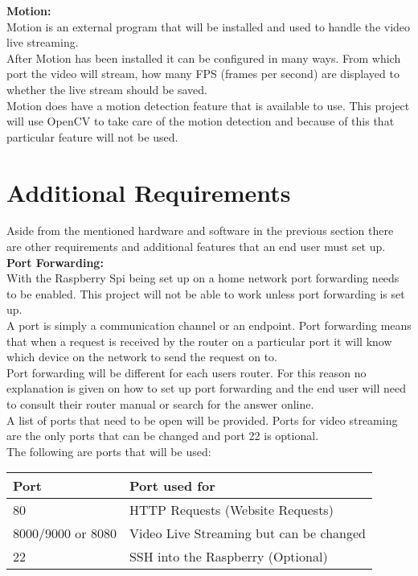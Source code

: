 \documentclass[]{report}
\begin{document}
\noindent
{\bf Motion:}\\
\break
Motion is an external program that will be installed and used to handle the video live streaming.\\

After Motion has been installed it can be configured in many ways. From which port the video will stream, how many FPS (frames per second) are displayed to whether the live stream should be saved.\\

Motion does have a motion detection feature that is available to use. This project will use OpenCV to take care of the motion detection and because of this that particular feature will not be used.\\

\clearpage
\section{Additional Requirements}	
\label{sec:additional}
Aside from the mentioned hardware and software in the previous section there are other requirements and additional features that an end user must set up.\\

\noindent
{\bf Port Forwarding:}\\
\break
With the Raspberry Spi being set up on a home network port forwarding needs to be enabled. This project will not be able to work unless port forwarding is set up.\\

A port is simply a communication channel or an endpoint. Port forwarding means that when a request is received by the router on a particular port it will know which device on the network to send the request on to.\\

Port forwarding will be different for each users router. For this reason no explanation is given on how to set up port forwarding and the end user will need to consult their router manual or search for the answer online.\\

A list of ports that need to be open will be provided. Ports for video streaming are the only ports that can be changed and port 22 is optional. \\

The following are ports that will be used:

\begin{center}
    \begin{tabular}{ | l | p{7cm} |}
    \hline
    {\bf Port} & {\bf Port used for} \\ \hline
   80 & HTTP Requests (Website Requests) \\ \hline 
   8000/9000 or 8080 & Video Live Streaming but can be changed\\ \hline
	22 & SSH into the Raspberry (Optional) \\ \hline
    \end{tabular}
    \\[0.5cm]
\end{center} 
\end{document}
